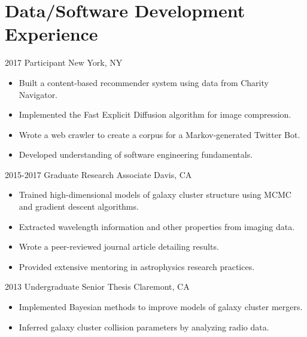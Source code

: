 \documentclass[]{cv-style}          %
\begin{document}


\section{Data/Software Development Experience}

\begin{entrylist}

\entry
  {2017}
  {Participant}
  {New York, NY}
  { 
  \begin{itemize}
    \item Built a content-based recommender system using data from Charity Navigator.
    \item Implemented the Fast Explicit Diffusion algorithm for image compression.
    \item Wrote a web crawler to create a corpus for a Markov-generated Twitter Bot.
    \item Developed understanding of software engineering fundamentals.\\
  \end{itemize}}
\entry
  {2015-2017}
  {Graduate Research Associate}
  {Davis, CA}
  { 
  \begin{itemize}
    \item Trained high-dimensional models of galaxy cluster structure using MCMC and gradient descent algorithms. 
    \item Extracted wavelength information and other properties from imaging data.
    \item Wrote a peer-reviewed journal article detailing results.
    \item Provided extensive mentoring in astrophysics research practices.\\
  \end{itemize}}
\entry
  {2013}
  {Undergraduate Senior Thesis}
  {Claremont, CA}
  { 
  \begin{itemize}
    \item Implemented Bayesian methods to improve models of galaxy cluster mergers.
    \item Inferred galaxy cluster collision parameters by analyzing radio data.

\end{itemize}}
\end{entrylist}
\end{document}

